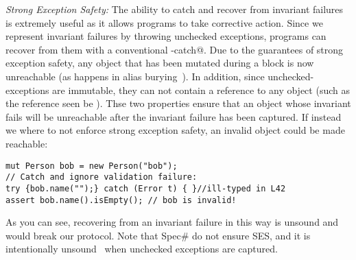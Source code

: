 \loseSpace
\noindent\textit{Strong Exception Safety:}
The ability to catch and recover from invariant failures is extremely useful as it allows programs to take corrective action.
Since we represent invariant failures by throwing unchecked exceptions, programs can recover from them with a conventional \Q@try-catch@.
	Due to the guarantees of strong exception safety, any object that has been mutated during a \Q@try@ block is now unreachable (as happens in alias burying~\cite{boyland2001alias}). In addition, since unchecked-exceptions are immutable, they can not contain a \Q@read@ reference to any object (such as the \Q@this@ reference seen be \Q@invariant@). Thse two properties ensure that an object whose invariant fails will be unreachable after the invariant failure has been captured. %
If instead we where to not enforce strong exception safety, an invalid object could be made reachable:
\saveSpace
\begin{lstlisting}[morekeywords={assert}, escapechar=\%]
mut Person bob = new Person("bob");
// Catch and ignore validation failure:
try {bob.name("");} catch (Error t) { }//ill-typed in L42
assert bob.name().isEmpty(); // bob is invalid!
\end{lstlisting}
\saveSpace
As you can see, recovering from an invariant failure in this way is unsound and would break our protocol.
Note that Spec\# do not ensure SES, and it is 
intentionally unsound~\cite{??} when unchecked exceptions are captured.







